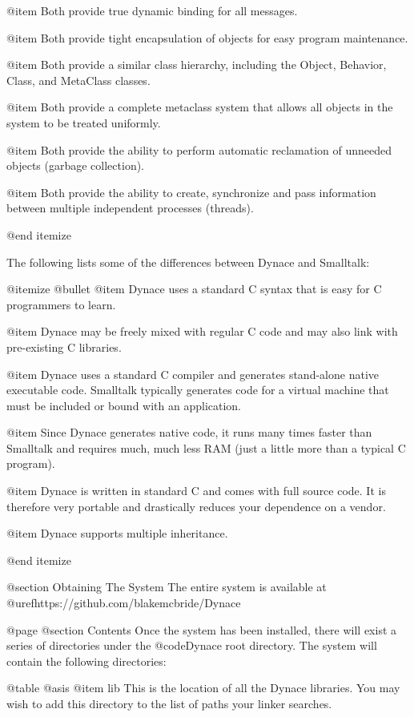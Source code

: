 @item
Both provide true dynamic binding for all messages.

@item
Both provide tight encapsulation of objects for
easy program maintenance.

@item
Both provide a similar class hierarchy, including
the Object, Behavior, Class, and MetaClass classes.

@item
Both provide a complete metaclass system that allows
all objects in the system to be treated uniformly.

@item
Both provide the ability to perform automatic reclamation
of unneeded objects (garbage collection).

@item
Both provide the ability to create, synchronize and
pass information between multiple independent processes (threads).

@end itemize


The following lists some of the differences between Dynace and
Smalltalk:

@itemize @bullet
@item
Dynace uses a standard C syntax that is easy for C programmers to learn.

@item
Dynace may be freely mixed with regular C code and may also link with
pre-existing C libraries.

@item
Dynace uses a standard C compiler and generates stand-alone native
executable code.  Smalltalk typically generates code for a virtual
machine that must be included or bound with an application.

@item
Since Dynace generates native code, it runs many times faster than Smalltalk
and requires much, much less RAM (just a little more than a typical C
program).

@item
Dynace is written in standard C and comes with full source code.  It is
therefore very portable and drastically reduces your dependence on a
vendor.

@item
Dynace supports multiple inheritance.

@end itemize

@section Obtaining The System
The entire system is available at @uref{https://github.com/blakemcbride/Dynace}



@page
@section Contents
Once the system has been installed, there will exist a series of
directories under the @code{Dynace} root directory.  The system will contain
the following directories:


@table @asis
@item lib
This is the location of all the Dynace libraries.  You may wish to add
this directory to the list of paths your linker searches.

